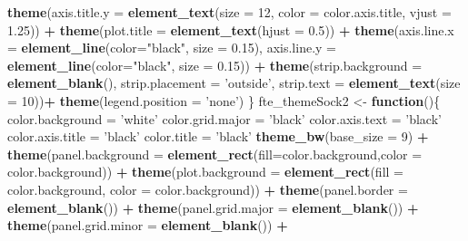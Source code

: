 \documentclass[]{article}
\newenvironment{Shaded}{\begin{snugshade}}{\end{snugshade}}
\newcommand{\KeywordTok}[1]{\textcolor[rgb]{0.13,0.29,0.53}{\textbf{#1}}}
\newcommand{\DataTypeTok}[1]{\textcolor[rgb]{0.13,0.29,0.53}{#1}}
\newcommand{\DecValTok}[1]{\textcolor[rgb]{0.00,0.00,0.81}{#1}}
\newcommand{\FloatTok}[1]{\textcolor[rgb]{0.00,0.00,0.81}{#1}}
\newcommand{\StringTok}[1]{\textcolor[rgb]{0.31,0.60,0.02}{#1}}
\newcommand{\ControlFlowTok}[1]{\textcolor[rgb]{0.13,0.29,0.53}{\textbf{#1}}}
\newcommand{\OperatorTok}[1]{\textcolor[rgb]{0.81,0.36,0.00}{\textbf{#1}}}
\newcommand{\NormalTok}[1]{#1}
\begin{document}
\begin{Shaded}
\begin{Highlighting}[]
\StringTok{    }\KeywordTok{theme}\NormalTok{(}\DataTypeTok{axis.title.y =} \KeywordTok{element_text}\NormalTok{(}\DataTypeTok{size =} \DecValTok{12}\NormalTok{, }\DataTypeTok{color =}\NormalTok{ color.axis.title, }\DataTypeTok{vjust =} \FloatTok{1.25}\NormalTok{)) }\OperatorTok{+}
\StringTok{    }\KeywordTok{theme}\NormalTok{(}\DataTypeTok{plot.title =} \KeywordTok{element_text}\NormalTok{(}\DataTypeTok{hjust =} \FloatTok{0.5}\NormalTok{)) }\OperatorTok{+}
\StringTok{    }\KeywordTok{theme}\NormalTok{(}\DataTypeTok{axis.line.x =} \KeywordTok{element_line}\NormalTok{(}\DataTypeTok{color=}\StringTok{"black"}\NormalTok{, }\DataTypeTok{size =} \FloatTok{0.15}\NormalTok{),}
          \DataTypeTok{axis.line.y =} \KeywordTok{element_line}\NormalTok{(}\DataTypeTok{color=}\StringTok{"black"}\NormalTok{, }\DataTypeTok{size =} \FloatTok{0.15}\NormalTok{)) }\OperatorTok{+}
\StringTok{    }\KeywordTok{theme}\NormalTok{(}\DataTypeTok{strip.background =} \KeywordTok{element_blank}\NormalTok{(),}
                  \DataTypeTok{strip.placement =} \StringTok{'outside'}\NormalTok{,}
          \DataTypeTok{strip.text =} \KeywordTok{element_text}\NormalTok{(}\DataTypeTok{size =} \DecValTok{10}\NormalTok{))}\OperatorTok{+}
\StringTok{    }\KeywordTok{theme}\NormalTok{(}\DataTypeTok{legend.position =} \StringTok{'none'}\NormalTok{)}
\NormalTok{\} }
\NormalTok{fte_themeSock2 <-}\StringTok{ }\ControlFlowTok{function}\NormalTok{()\{}
\NormalTok{  color.background =}\StringTok{ 'white'}
\NormalTok{  color.grid.major =}\StringTok{ 'black'}
\NormalTok{  color.axis.text =}\StringTok{ 'black'}
\NormalTok{  color.axis.title =}\StringTok{ 'black'}
\NormalTok{  color.title =}\StringTok{ 'black'}
  \KeywordTok{theme_bw}\NormalTok{(}\DataTypeTok{base_size =} \DecValTok{9}\NormalTok{) }\OperatorTok{+}\StringTok{ }
\StringTok{    }\KeywordTok{theme}\NormalTok{(}\DataTypeTok{panel.background =} \KeywordTok{element_rect}\NormalTok{(}\DataTypeTok{fill=}\NormalTok{color.background,}\DataTypeTok{color =}\NormalTok{ color.background)) }\OperatorTok{+}
\StringTok{    }\KeywordTok{theme}\NormalTok{(}\DataTypeTok{plot.background =} \KeywordTok{element_rect}\NormalTok{(}\DataTypeTok{fill =}\NormalTok{ color.background, }\DataTypeTok{color =}\NormalTok{ color.background)) }\OperatorTok{+}
\StringTok{    }\KeywordTok{theme}\NormalTok{(}\DataTypeTok{panel.border =} \KeywordTok{element_blank}\NormalTok{()) }\OperatorTok{+}
\StringTok{    }\KeywordTok{theme}\NormalTok{(}\DataTypeTok{panel.grid.major =} \KeywordTok{element_blank}\NormalTok{()) }\OperatorTok{+}\StringTok{ }
\StringTok{    }\KeywordTok{theme}\NormalTok{(}\DataTypeTok{panel.grid.minor =} \KeywordTok{element_blank}\NormalTok{()) }\OperatorTok{+}\StringTok{ }

\end{Highlighting}
\end{Shaded}
\end{document}
